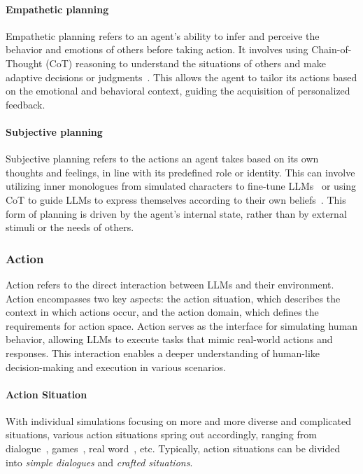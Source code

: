 \paragraph{Empathetic planning} Empathetic planning refers to an agent's ability to infer and perceive the behavior and emotions of others before taking action. It involves using Chain-of-Thought (CoT) reasoning to understand the situations of others and make adaptive decisions or judgments~\cite{xie2023wallstreetneophytezeroshot, 10.19066/COGSCI.2024.35.1.002, sun2023rational}. This allows the agent to tailor its actions based on the emotional and behavioral context, guiding the acquisition of personalized feedback.

\paragraph{Subjective planning} Subjective planning refers to the actions an agent takes based on its own thoughts and feelings, in line with its predefined role or identity.
This can involve utilizing inner monologues from simulated characters to fine-tune LLMs~\cite{shao2023characterllmtrainableagentroleplaying,ran2024capturingmindsjustwords} or using CoT to guide LLMs to express themselves according to their own beliefs~\cite{xie2024largelanguagemodelagents}. 
This form of planning is driven by the agent's internal state, rather than by external stimuli or the needs of others.


\subsubsection{Action}\label{sec:action}

Action refers to the direct interaction between LLMs and their environment. Action encompasses two key aspects: the action situation, which describes the context in which actions occur, and the action domain, which defines the requirements for action space. Action serves as the interface for simulating human behavior, allowing LLMs to execute tasks that mimic real-world actions and responses. This interaction enables a deeper understanding of human-like decision-making and execution in various scenarios.

\paragraph{Action Situation}
With individual simulations focusing on more and more diverse and complicated situations, various action situations spring out accordingly, ranging from dialogue~\cite{cho2022personalizeddialoguegeneratorimplicit}, games~\cite{light2023avalonbenchevaluatingllmsplaying}, real word~\cite{xiang2023languagemodelsmeetworld}, etc. Typically, action situations can be divided into \textit{simple dialogues} and \textit{crafted situations}.

